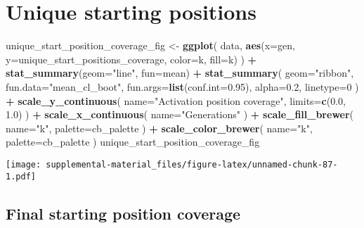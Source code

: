 \documentclass[]{book}
\newenvironment{Shaded}{\begin{snugshade}}{\end{snugshade}}
\newcommand{\DataTypeTok}[1]{\textcolor[rgb]{0.13,0.29,0.53}{#1}}
\newcommand{\DecValTok}[1]{\textcolor[rgb]{0.00,0.00,0.81}{#1}}
\newcommand{\FloatTok}[1]{\textcolor[rgb]{0.00,0.00,0.81}{#1}}
\newcommand{\KeywordTok}[1]{\textcolor[rgb]{0.13,0.29,0.53}{\textbf{#1}}}
\newcommand{\NormalTok}[1]{#1}
\newcommand{\OperatorTok}[1]{\textcolor[rgb]{0.81,0.36,0.00}{\textbf{#1}}}
\newcommand{\StringTok}[1]{\textcolor[rgb]{0.31,0.60,0.02}{#1}}
\begin{document}
\hypertarget{unique-starting-positions-7}{%
\section{Unique starting positions}\label{unique-starting-positions-7}}

\begin{Shaded}
\begin{Highlighting}[]
\NormalTok{unique_start_position_coverage_fig <-}\StringTok{ }\KeywordTok{ggplot}\NormalTok{(}
\NormalTok{    data,}
    \KeywordTok{aes}\NormalTok{(}\DataTypeTok{x=}\NormalTok{gen, }\DataTypeTok{y=}\NormalTok{unique_start_positions_coverage, }\DataTypeTok{color=}\NormalTok{k, }\DataTypeTok{fill=}\NormalTok{k)}
\NormalTok{  ) }\OperatorTok{+}
\StringTok{  }\KeywordTok{stat_summary}\NormalTok{(}\DataTypeTok{geom=}\StringTok{"line"}\NormalTok{, }\DataTypeTok{fun=}\NormalTok{mean) }\OperatorTok{+}
\StringTok{  }\KeywordTok{stat_summary}\NormalTok{(}
    \DataTypeTok{geom=}\StringTok{"ribbon"}\NormalTok{,}
    \DataTypeTok{fun.data=}\StringTok{"mean_cl_boot"}\NormalTok{,}
    \DataTypeTok{fun.args=}\KeywordTok{list}\NormalTok{(}\DataTypeTok{conf.int=}\FloatTok{0.95}\NormalTok{),}
    \DataTypeTok{alpha=}\FloatTok{0.2}\NormalTok{,}
    \DataTypeTok{linetype=}\DecValTok{0}
\NormalTok{  ) }\OperatorTok{+}
\StringTok{  }\KeywordTok{scale_y_continuous}\NormalTok{(}
    \DataTypeTok{name=}\StringTok{"Activation position coverage"}\NormalTok{,}
    \DataTypeTok{limits=}\KeywordTok{c}\NormalTok{(}\FloatTok{0.0}\NormalTok{, }\FloatTok{1.0}\NormalTok{)}
\NormalTok{  ) }\OperatorTok{+}
\StringTok{  }\KeywordTok{scale_x_continuous}\NormalTok{(}
    \DataTypeTok{name=}\StringTok{"Generations"}
\NormalTok{  ) }\OperatorTok{+}
\StringTok{  }\KeywordTok{scale_fill_brewer}\NormalTok{(}
    \DataTypeTok{name=}\StringTok{"k"}\NormalTok{,}
    \DataTypeTok{palette=}\NormalTok{cb_palette}
\NormalTok{  ) }\OperatorTok{+}
\StringTok{  }\KeywordTok{scale_color_brewer}\NormalTok{(}
    \DataTypeTok{name=}\StringTok{"k"}\NormalTok{,}
    \DataTypeTok{palette=}\NormalTok{cb_palette}
\NormalTok{  )}
\NormalTok{unique_start_position_coverage_fig}
\end{Highlighting}
\end{Shaded}

\texttt{[image: supplemental-material\_files/figure-latex/unnamed-chunk-87-1.pdf]}

\hypertarget{final-starting-position-coverage-6}{%
\subsection{Final starting position coverage}\label{final-starting-position-coverage-6}}
\end{document}
